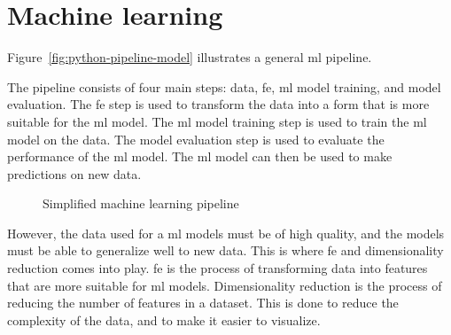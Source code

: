 \section{Machine learning}\label{sec:machine-learning}
Figure~\ref{fig:python-pipeline-model} illustrates a general \gls{ml} pipeline.

The pipeline consists of four main steps: data, \gls{fe}, \gls{ml} model training, and model evaluation. The \gls{fe} step is used to transform the data into a form that is more suitable for the \gls{ml} model. The \gls{ml} model training step is used to train the \gls{ml} model on the data. The model evaluation step is used to evaluate the performance of the \gls{ml} model. The \gls{ml} model can then be used to make predictions on new data.


\begin{figure}[htb!]
    \centering
    \caption{Simplified machine learning pipeline}
    \label{fig:basic-machine-learning-pipeline}
\end{figure}


However, the data used for a \gls{ml} models must be of high quality, and the models must be able to generalize well to new data. This is where \gls{fe} and dimensionality reduction comes into play. \gls{fe} is the process of transforming data into features that are more suitable for \gls{ml} models. Dimensionality reduction is the process of reducing the number of features in a dataset. This is done to reduce the complexity of the data, and to make it easier to visualize.